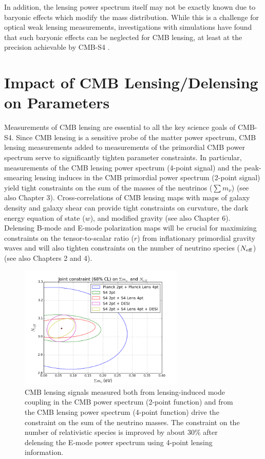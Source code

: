 In addition, the lensing power spectrum itself may not be exactly known due to baryonic effects which modify the mass distribution. While this is a challenge for optical weak lensing measurements, investigations with simulations have found that such baryonic effects can be neglected for CMB lensing, at least at the precision achievable by CMB-S4 \cite{Natarajan:2014xba}.

\section{Impact of CMB Lensing/Delensing on Parameters}\label{forecasts}

Measurements of CMB lensing are essential to all the key science goals of CMB-S4.  Since CMB lensing is a sensitive probe of the matter power spectrum, CMB lensing measurements added to measurements of the primordial CMB power spectrum serve to significantly tighten parameter constraints.  In particular, measurements of the CMB lensing power spectrum (4-point signal) and the peak-smearing lensing induces in the CMB primordial power spectrum (2-point signal) yield tight constraints on the sum of the masses of the neutrinos ($\sum {m_\nu}$) (see also Chapter 3).  Cross-correlations of CMB lensing maps with maps of galaxy density and galaxy shear can provide tight constraints on curvature, the dark energy equation of state ($w$), and modified gravity (see also Chapter 6).  Delensing B-mode and E-mode polarization maps will be crucial for maximizing constraints on the tensor-to-scalar ratio ($r$) from inflationary primordial gravity waves and will also tighten constraints on the number of neutrino species ($N_{\rm{eff}}$) (see also Chapters 2 and 4).  

\vspace{0.3cm}
\begin{figure}[htbp]
\centering
\includegraphics[width=0.7\textwidth]{CMBLensing/Neff_Mnu.png}
\caption{CMB lensing signals measured both from lensing-induced mode coupling in the CMB power spectrum (2-point function) and from the CMB lensing power spectrum (4-point function) drive the constraint on the sum of the neutrino masses.  The constraint on the number of relativistic species is improved by about 30\% after delensing the E-mode power spectrum using 4-point lensing information.}
\label{neutrinos}
\end{figure}

